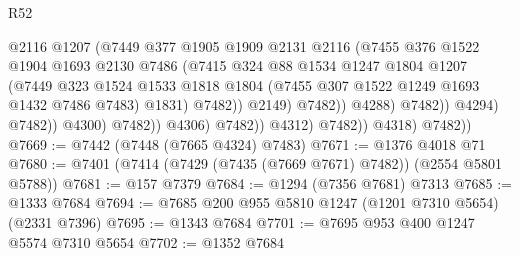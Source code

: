 \begin{lexlean}{R52}
\begin{coremodule}
                                            @2116
                                            @1207
                                            (@7449
                                              @377
                                              @1905
                                              @1909
                                              @2131
                                              @2116
                                              (@7455
                                                @376
                                                @1522
                                                @1904
                                                @1693
                                                @2130
                                                @7486
                                                (@7415
                                                  @324
                                                  @88
                                                  @1534
                                                  @1247
                                                  @1804
                                                  @1207
                                                  (@7449
                                                    @323
                                                    @1524
                                                    @1533
                                                    @1818
                                                    @1804
                                                    (@7455 @307 @1522 @1249 @1693 @1432 @7486 @7483)
                                                    @1831)
                                                  @7482))
                                              @2149)
                                            @7482))
                                        @4288)
                                      @7482))
                                  @4294)
                                @7482))
                            @4300)
                          @7482))
                      @4306)
                    @7482))
                @4312)
              @7482))
          @4318)
        @7482))
@7669 := @7442 (@7448 (@7665 @4324) @7483)
@7671 := @1376 @4018 @71
@7680 := @7401 (@7414 (@7429 (@7435 (@7669 @7671) @7482)) (@2554 @5801 @5788))
@7681 := @157 @7379
@7684 := @1294 (@7356 @7681) @7313
@7685 := @1333 @7684
@7694 := @7685 @200 @955 @5810 @1247 (@1201 @7310 @5654) (@2331 @7396)
@7695 := @1343 @7684
@7701 := @7695 @953 @400 @1247 @5574 @7310 @5654
@7702 := @1352 @7684

\end{coremodule}
\end{lexlean}
